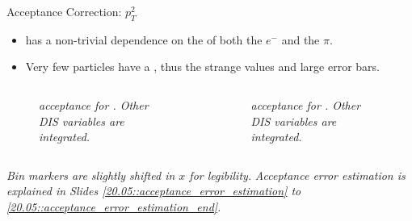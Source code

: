 \begin{frame}{Acceptance Correction: $p_T^2$}
    \label{11.55::pt2}

    \begin{itemize}
        \item
             has a non-trivial dependence on the \ef{$\theta$} of both the $e^-$ and the $\pi$.

        \vspace{6pt}
        \item
            Very few particles have a , thus the strange values and large error bars.
    \end{itemize}

    \vspace{-12pt}
    \begin{columns}
        \begin{column}{.49\linewidth}
            \begin{center}
                \begin{figure}[t]
                    \scriptsize{\textit{
                         acceptance for \ef{$\pi^-$}.
                        Other DIS variables are integrated.
                    }}
                \end{figure}
            \end{center}
        \end{column}

        \begin{column}{.49\linewidth}
            \begin{center}
                \begin{figure}[t]
                    \scriptsize{\textit{
                         acceptance for \ef{$\pi^+$}.
                        Other DIS variables are integrated.
                    }}
                \end{figure}
            \end{center}
        \end{column}
    \end{columns}

    \begin{flushright}
        \tiny{\textit{Bin markers are slightly shifted in $x$ for legibility.}}
        \tiny{\textit{Acceptance error estimation is explained in Slides \textcolor{efd_purple}{\ref{20.05::acceptance_error_estimation}} to \textcolor{efd_purple}{\ref{20.05::acceptance_error_estimation_end}}.}}
    \end{flushright}
\end{frame}


